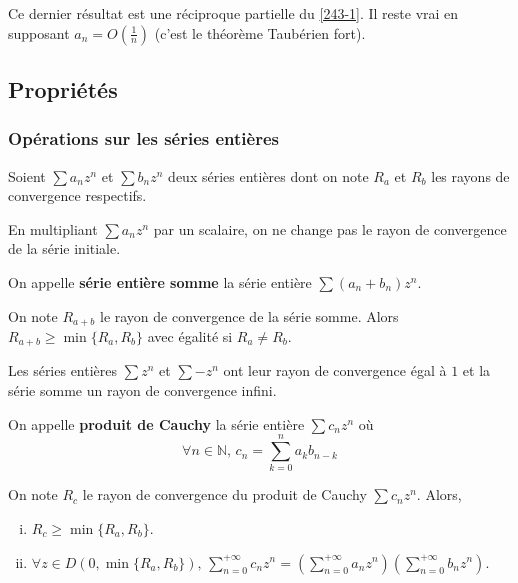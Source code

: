	\begin{remark}
		Ce dernier résultat est une réciproque partielle du \cref{243-1}. Il reste vrai en supposant $a_n = O \left( \frac{1}{n} \right)$ (c'est le théorème Taubérien fort).
	\end{remark}

	\subsection{Propriétés}

	\subsubsection{Opérations sur les séries entières}


	Soient $\sum a_n z^n$ et $\sum b_n z^n$ deux séries entières dont on note $R_a$ et $R_b$ les rayons de convergence respectifs.

	\begin{proposition}
		En multipliant $\sum a_n z^n$ par un scalaire, on ne change pas le rayon de convergence de la série initiale.
	\end{proposition}

	\begin{definition}
		On appelle \textbf{série entière somme} la série entière $\sum (a_n + b_n) z^n$.
	\end{definition}

	\begin{proposition}
		On note $R_{a+b}$ le rayon de convergence de la série somme. Alors $R_{a+b} \geq \min \{R_a, R_b\}$ avec égalité si $R_a \neq R_b$.
	\end{proposition}


	\begin{example}
		Les séries entières $\sum z^n$ et $\sum -z^n$ ont leur rayon de convergence égal à $1$ et la série somme un rayon de convergence infini.
	\end{example}


	\begin{definition}
		On appelle \textbf{produit de Cauchy} la série entière $\sum c_n z^n$ où
		\[ \forall n \in \mathbb{N}, \, c_n = \sum_{k=0}^n a_k b_{n-k} \]
	\end{definition}

	\begin{proposition}
		On note $R_{c}$ le rayon de convergence du produit de Cauchy $\sum c_n z^n$. Alors,
		\begin{enumerate}[(i)]
			\item $R_c \geq \min \{R_a, R_b\}$.
			\item $\forall z \in D(0, \min \{R_a, R_b\}), \, \sum_{n = 0}^{+\infty} c_n z^n = (\sum_{n = 0}^{+\infty} a_n z^n) (\sum_{n = 0}^{+\infty} b_n z^n)$.
		\end{enumerate}
	\end{proposition}

